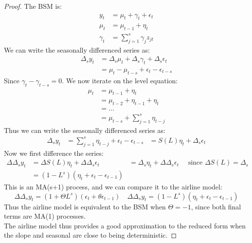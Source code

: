 \documentclass[DIV=14,titlepage=false]{scrreprt}
\begin{document}
\begin{proof}
    The BSM is:
    \begin{align*}
        y_t &= \mu_t + \gamma_t + \epsilon_t\\
        \mu_t &= \mu_{t-1}  + \eta_t\\
        \gamma_t &= \sum_{j=1}^s \gamma_j z_{jt}
    \end{align*}
    We can write the seasonally differenced series as:
    \begin{align*}
        \Delta_s y_t &= \Delta_s \mu_t + \Delta_s \gamma_t + \Delta_s \epsilon_t\\
        &= \mu_t - \mu_{t-s} + \epsilon_t - \epsilon_{t-s}
    \end{align*}
    Since $\gamma_t - \gamma_{t-s} = 0$. We now iterate on the level equation:
    \begin{align*}
        \mu_t &= \mu_{t-1} + \eta_t\\
        &= \mu_{t-2} + \eta_{t-1} + \eta_t\\
        &= \ldots\\
        &= \mu_{t-s} + \sum_{j=1}^s \eta_{t-j}
    \end{align*}
    Thus we can write the seasonally differenced series as:
    \begin{align*}
        \Delta_s y_t &= \sum_{j=1}^s \eta_{t-j} + \epsilon_t - \epsilon_{t-s}
        &= S(L) \eta_t + \Delta_s \epsilon_t
    \end{align*}
    Now we first difference the series:
    \begin{align*}
        \Delta \Delta_s y_t &= \Delta S(L) \eta_t + \Delta \Delta_s \epsilon_t
        &= \Delta_s \eta_t + \Delta \Delta_s \epsilon_t \quad \text{ since $\Delta S(L) = \Delta_s$}\\
        &= (1-L^s) (\eta_t + \epsilon_t - \epsilon_{t-1}) 
    \end{align*}
    This is an MA(s+1) process, and we can compare it to the airline model:
    \[
        \Delta \Delta_s y_t = (1+\Theta L^s)(\epsilon_t + \theta \epsilon_{t-1}) \quad \Delta \Delta_s y_t = (1-L^s)(\eta_t + \epsilon_t - \epsilon_{t-1})
    \]
    Thus the airline model is equivalent to the BSM when $\Theta = -1$, since both final terms are MA(1) processes.\\
    The airline model thus provides a good approximation to the reduced form when the slope and seasonal are close to being deterministic.
\end{proof}
\end{document}
